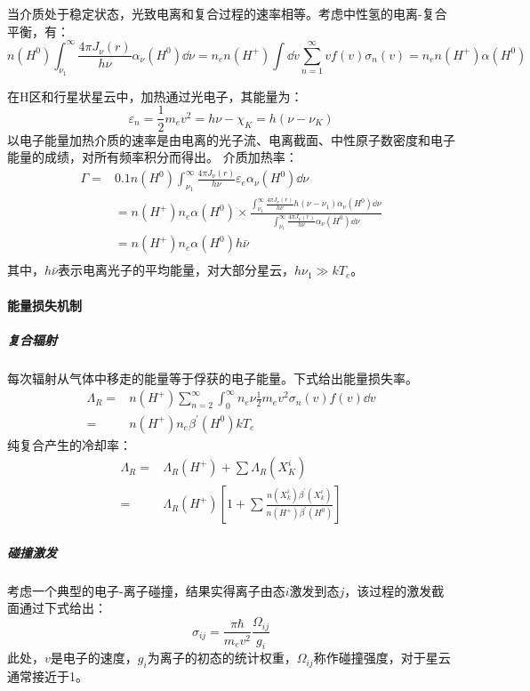 当介质处于稳定状态，光致电离和复合过程的速率相等。考虑中性氢的电离-复合平衡，有：
\begin{equation}
	n(H^0)\int_{\nu_{1}}^{\infty}\frac{4\pi J_{\nu}(r)}{h\nu}\alpha_{\nu}(H^0)\dd \nu=n_{e}n(H^+)\int \dd v\sum_{n=1}^{\infty}vf(v)\sigma_{n}(v)=n_{e}n(H^+)\alpha(H^0)
\end{equation}

在H区和行星状星云中，加热通过光电子，其能量为：
\begin{equation}
	\varepsilon_{n}=\frac{1}{2}m_{e}v^2=h\nu-\chi_{K}=h(\nu-\nu_{K})
\end{equation}
以电子能量加热介质的速率是由电离的光子流、电离截面、中性原子数密度和电子能量的成绩，对所有频率积分而得出。
介质加热率：
\begin{equation}
	\begin{split}
		\Gamma =&0.1n(H^0)\int_{\nu_{1}}^{\infty}\frac{4\pi J_{\nu}(r)}{h\nu}\varepsilon_{e}\alpha_{\nu}(H^0)\dd \nu\\
		&=n(H^+)n_{e}\alpha(H^0)\times\frac{\int_{\nu_{1}}^{\infty}\frac{4\pi J_{\nu}(r)}{h\nu}h(\nu-\nu_{1})\alpha_{\nu}(H^0)\dd \nu}{\int_{\nu_{1}}^{\infty}\frac{4\pi J_{\nu}(r)}{h\nu}\alpha_{\nu}(H^0)\dd \nu}\\
		&=n(H^+)n_{e}\alpha(H^0)h\bar{\nu}\\
	\end{split}
\end{equation}
其中，$h\bar{\nu}$表示电离光子的平均能量，对大部分星云，$h\nu_{1}\gg kT_{e}$。
\paragraph{能量损失机制}
\subparagraph{复合辐射}
每次辐射从气体中移走的能量等于俘获的电子能量。下式给出能量损失率。
\begin{equation}
	\begin{split}
		\varLambda_{R}=&n(H^+)\sum_{n=2}^{\infty}\int_{0}^{\infty}n_{e}\nu\frac{1}{2}m_{e}v^2\sigma_{n}(v)f(v)\dd v\\
		=&n(H^+)n_{e}\beta^\prime(H^0)kT_{e}
	\end{split}
\end{equation}
纯复合产生的冷却率：
\begin{equation}
	\begin{split}
		\varLambda_{R}=&\varLambda_{R}(H^+)+\sum\varLambda_{R}(X_{K}^{i})\\
		=&\varLambda_{R}(H^+)\left[1+\sum\frac{n(X_{k}^{i})\beta^\prime(X_{k}^{i})}{n(H^+)\beta^\prime(H^0)}\right]
	\end{split}
\end{equation}
\subparagraph{碰撞激发}
考虑一个典型的电子-离子碰撞，结果实得离子由态$i$激发到态$j$，该过程的激发截面通过下式给出：
\begin{equation}
	\sigma_{ij}=\frac{\pi\hbar}{m_{e}v^2}\frac{\Omega_{ij}}{g_{i}}
\end{equation}
此处，$v$是电子的速度，$g_{i}$为离子的初态的统计权重，$\Omega_{ij}$称作碰撞强度，对于星云通常接近于1。

